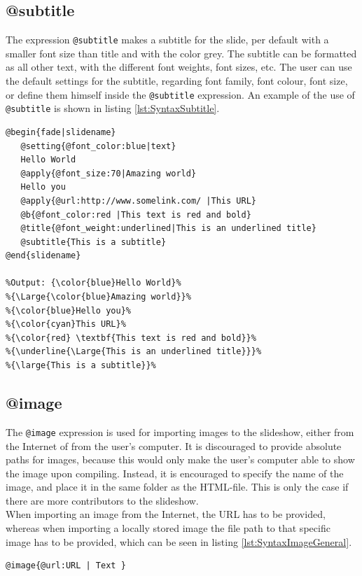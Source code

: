 {\subsection{@subtitle}
The expression \lstinline!@subtitle! makes a subtitle for the slide, per default with a smaller font size than title and with the color grey. The subtitle can be formatted as all other text, with the different font weights, font sizes, etc. The user can use the default settings for the subtitle, regarding font family, font colour, font size, or define them himself inside the \lstinline!@subtitle! expression.
An example of the use of \lstinline!@subtitle! is shown in listing \ref{lst:SyntaxSubtitle}.
\begin{lstlisting}[frame=single, caption=Hello World with subtitle, label=lst:SyntaxSubtitle]
@begin{fade|slidename}
   @setting{@font_color:blue|text}
   Hello World
   @apply{@font_size:70|Amazing world}
   Hello you
   @apply{@url:http://www.somelink.com/ |This URL}
   @b{@font_color:red |This text is red and bold}
   @title{@font_weight:underlined|This is an underlined title}
   @subtitle{This is a subtitle}
@end{slidename}

%Output: {\color{blue}Hello World}%
%{\Large{\color{blue}Amazing world}}%
%{\color{blue}Hello you}%
%{\color{cyan}This URL}%
%{\color{red} \textbf{This text is red and bold}}%
%{\underline{\Large{This is an underlined title}}}%
%{\large{This is a subtitle}}%
\end{lstlisting}

\subsection{@image}
The \lstinline!@image! expression is used for importing images to the slideshow, either from the Internet of from the user's computer.
It is discouraged to provide absolute paths for images, because this would only make the user's computer able to show the image upon compiling. Instead, it is encouraged to specify the name of the image, and place it in the same folder as the HTML-file. This is only the case if there are more contributors to the slideshow.\\
When importing an image from the Internet, the URL has to be provided, whereas when importing a locally stored image the file path to that specific image has to be provided, which can be seen in listing \ref{lst:SyntaxImageGeneral}.

\begin{lstlisting}[frame=single, caption=Generic \texttt{image} expression example, label=lst:SyntaxImageGeneral]
@image{@url:URL | Text }
\end{lstlisting}

}
